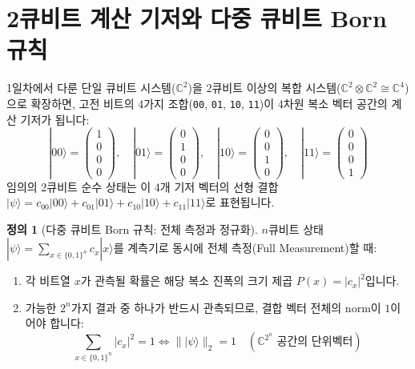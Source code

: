 \documentclass[11pt, a4paper]{article}
\newcommand{\ket}[1]{|#1\rangle}
\theoremstyle{definition}
\newtheorem{definition}{정의}[section]
\begin{document}
\section{2큐비트 계산 기저와 다중 큐비트 Born 규칙}
1일차에서 다룬 단일 큐비트 시스템($\mathbb{C}^2$)을 2큐비트 이상의 복합 시스템($\mathbb{C}^2 \otimes \mathbb{C}^2 \cong \mathbb{C}^4$)으로 확장하면, 고전 비트의 4가지 조합(\texttt{00}, \texttt{01}, \texttt{10}, \texttt{11})이 4차원 복소 벡터 공간의 계산 기저가 됩니다:
$$\ket{00} = \begin{pmatrix} 1 \\ 0 \\ 0 \\ 0 \end{pmatrix}, \quad \ket{01} = \begin{pmatrix} 0 \\ 1 \\ 0 \\ 0 \end{pmatrix}, \quad \ket{10} = \begin{pmatrix} 0 \\ 0 \\ 1 \\ 0 \end{pmatrix}, \quad \ket{11} = \begin{pmatrix} 0 \\ 0 \\ 0 \\ 1 \end{pmatrix}$$
임의의 2큐비트 순수 상태는 이 4개 기저 벡터의 선형 결합 $\ket{\psi} = c_{00}\ket{00} + c_{01}\ket{01} + c_{10}\ket{10} + c_{11}\ket{11}$로 표현됩니다.

\begin{definition}[다중 큐비트 Born 규칙: 전체 측정과 정규화]
$n$큐비트 상태 $\ket{\psi} = \sum_{x \in \{0,1\}^n} c_x \ket{x}$를 계측기로 동시에 전체 측정(Full Measurement)할 때:
\begin{enumerate}
    \item 각 비트열 $x$가 관측될 확률은 해당 복소 진폭의 크기 제곱 $P(x) = |c_x|^2$입니다.
    \item 가능한 $2^n$가지 결과 중 하나가 반드시 관측되므로, 결합 벡터 전체의 norm이 $1$이어야 합니다:
    $$\sum_{x \in \{0,1\}^n} |c_x|^2 = 1 \iff \|\ket{\psi}\|_2 = 1 \quad (\mathbb{C}^{2^n}\text{ 공간의 단위벡터})$$
\end{enumerate}
\end{definition}
\end{document}
